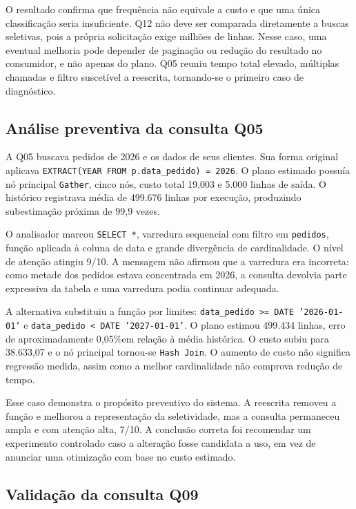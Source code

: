 \documentclass{UNESC}
\newcommand{\codigo}[1]{\texttt{#1}}
\newcommand{\perc}{\%}
\begin{document}
O resultado confirma que frequência não equivale a custo e que uma única classificação seria insuficiente. Q12 não deve ser comparada diretamente a buscas seletivas, pois a própria solicitação exige milhões de linhas. Nesse caso, uma eventual melhoria pode depender de paginação ou redução do resultado no consumidor, e não apenas do plano. Q05 reuniu tempo total elevado, múltiplas chamadas e filtro suscetível a reescrita, tornando-se o primeiro caso de diagnóstico.

\subsection{Análise preventiva da consulta Q05}

A Q05 buscava pedidos de 2026 e os dados de seus clientes. Sua forma original aplicava \codigo{EXTRACT(YEAR FROM p.data\_pedido) = 2026}. O plano estimado possuía nó principal \codigo{Gather}, cinco nós, custo total 19.003 e 5.000 linhas de saída. O histórico registrava média de 499.676 linhas por execução, produzindo subestimação próxima de 99,9 vezes.

O analisador marcou \codigo{SELECT *}, varredura sequencial com filtro em \codigo{pedidos}, função aplicada à coluna de data e grande divergência de cardinalidade. O nível de atenção atingiu 9/10. A mensagem não afirmou que a varredura era incorreta: como metade dos pedidos estava concentrada em 2026, a consulta devolvia parte expressiva da tabela e uma varredura podia continuar adequada.

A alternativa substituiu a função por limites: \codigo{data\_pedido >= DATE '2026-01-01'} e \codigo{data\_pedido < DATE '2027-01-01'}. O plano estimou 499.434 linhas, erro de aproximadamente 0,05\perc em relação à média histórica. O custo subiu para 38.633,07 e o nó principal tornou-se \codigo{Hash Join}. O aumento de custo não significa regressão medida, assim como a melhor cardinalidade não comprova redução de tempo.

Esse caso demonstra o propósito preventivo do sistema. A reescrita removeu a função e melhorou a representação da seletividade, mas a consulta permaneceu ampla e com atenção alta, 7/10. A conclusão correta foi recomendar um experimento controlado caso a alteração fosse candidata a uso, em vez de anunciar uma otimização com base no custo estimado.

\subsection{Validação da consulta Q09}
\end{document}

